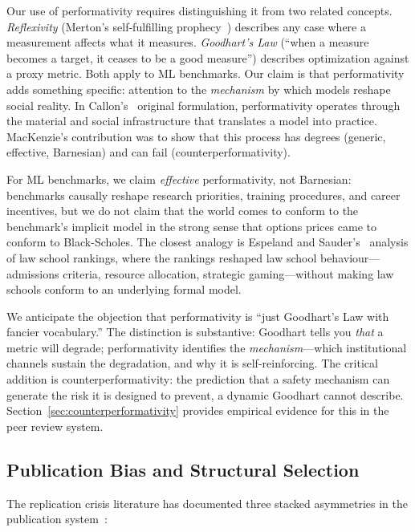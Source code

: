 \documentclass{article}
\begin{document}
Our use of performativity requires distinguishing it from two related concepts. \textit{Reflexivity} (Merton's self-fulfilling prophecy~\citep{merton_self_fulfilling_1948}) describes any case where a measurement affects what it measures. \textit{Goodhart's Law} (``when a measure becomes a target, it ceases to be a good measure'') describes optimization against a proxy metric. Both apply to ML benchmarks. Our claim is that performativity adds something specific: attention to the \textit{mechanism} by which models reshape social reality. In Callon's~\citep{callon_laws_1998} original formulation, performativity operates through the material and social infrastructure that translates a model into practice. MacKenzie's contribution was to show that this process has degrees (generic, effective, Barnesian) and can fail (counterperformativity).

For ML benchmarks, we claim \textit{effective} performativity, not Barnesian: benchmarks causally reshape research priorities, training procedures, and career incentives, but we do not claim that the world comes to conform to the benchmark's implicit model in the strong sense that options prices came to conform to Black-Scholes. The closest analogy is Espeland and Sauder's~\citep{espeland_sauder_2007} analysis of law school rankings, where the rankings reshaped law school behaviour---admissions criteria, resource allocation, strategic gaming---without making law schools conform to an underlying formal model.

We anticipate the objection that performativity is ``just Goodhart's Law with fancier vocabulary.'' The distinction is substantive: Goodhart tells you \textit{that} a metric will degrade; performativity identifies the \textit{mechanism}---which institutional channels sustain the degradation, and why it is self-reinforcing. The critical addition is counterperformativity: the prediction that a safety mechanism can generate the risk it is designed to prevent, a dynamic Goodhart cannot describe. Section~\ref{sec:counterperformativity} provides empirical evidence for this in the peer review system.

\subsection{Publication Bias and Structural Selection}

The replication crisis literature has documented three stacked asymmetries in the publication system~\citep{franco_publication_2014, simonsohn_p_curve_2014}:
\end{document}
